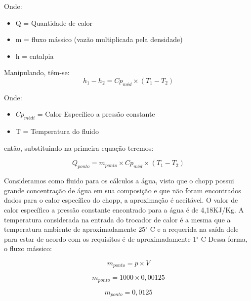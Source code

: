             Onde:
            \begin{itemize}
                \item Q = Quantidade de calor
                \item m = fluxo mássico (vazão multiplicada pela densidade)
                \item h = entalpia
            \end{itemize}

            Manipulando, têm-se:
            \begin{equation}
                h_1 - h_2 = Cp_{méd} \times (T_1 - T_2)
            \end{equation}

            Onde:
            \begin{itemize}
                \item $Cp_{médi}$ = Calor Específico a pressão constante
                \item T = Temperatura do fluido
            \end{itemize}
            então, substituindo na primeira equação teremos:
            
            \begin{equation}
                Q_{ponto} = m_{ponto} \times Cp_{méd} \times (T_1 - T_2)
            \end{equation}

            Consideramos como fluido para os cálculos a água, visto que o chopp possui
            grande concentração de água em sua composição e que não foram encontrados dados
            para o calor específico do chopp, a aproximação é aceitável. O valor de calor
            específico a pressão constante encontrado para a água é de 4,18KJ/Kg. A temperatura
            considerada na entrada do trocador de calor é a mesma que a temperatura ambiente
            de aproximadamente  25$^\circ$ C e a requerida na saída dele para estar de acordo com os
            requisitos é de aproximadamente 1$^\circ$ C Dessa forma, o fluxo mássico:

            \begin{equation}
                m_{ponto} = p \times V
            \end{equation}

            \begin{equation}
                m_{ponto} = 1000 \times 0,00125
            \end{equation}

            \begin{equation}
                m_{ponto} = 0,0125
            \end{equation}

